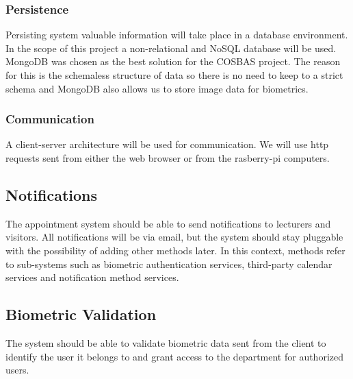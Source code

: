 \subsubsection{Persistence}
Persisting system valuable information will take place in a database environment. In the scope of this project a non-relational and NoSQL database will be used. MongoDB was chosen as the best solution for the COSBAS project. The reason for this is the schemaless structure of data so there is no need to keep to a strict schema and MongoDB also allows us to store image data for biometrics.

\subsubsection{Communication}
A client-server architecture will be used for communication. We will use http requests sent from either the web browser or from the rasberry-pi computers. 

\subsection{Notifications}
The appointment system should be able to send notifications to lecturers and visitors. All notifications will be via email, but the system should stay pluggable with the possibility of adding other methods later. In this context, methods refer to sub-systems such as biometric authentication services, third-party calendar services and notification method services.

\subsection{Biometric Validation}
The system should be able to validate biometric data sent from the client to identify the user it belongs to and grant access to the department for authorized users.